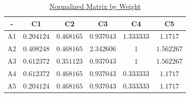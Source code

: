 \begin{table}[!ht]
    \centering
    \caption{
        \hyperref
        [eq:weighted_normalized_estimate]
        {Normalized Matrix by Weight}
    }
    \label{tab:weighted}

    \begin{tabular}{|c|c|c|c|c|c|}
        \toprule
        -  & C1         & C2         & C3         & C4         & C5         \\

        \midrule
        A1 & $0.204124$ & $0.468165$ & $0.937043$ & $1.333333$ & $1.1717$   \\
        A2 & $0.408248$ & $0.468165$ & $2.342606$ & $1$        & $1.562267$ \\
        A3 & $0.612372$ & $0.351123$ & $0.937043$ & $1$        & $1.562267$ \\
        A4 & $0.612372$ & $0.468165$ & $0.937043$ & $0.333333$ & $1.1717$   \\
        A5 & $0.204124$ & $0.468165$ & $0.937043$ & $0.333333$ & $1.1717$   \\

        \bottomrule
    \end{tabular}
\end{table}

\newpage

